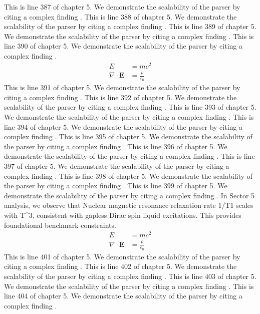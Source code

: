 This is line 387 of chapter 5. We demonstrate the scalability of the parser by citing a complex finding \cite{ref5_387}.
This is line 388 of chapter 5. We demonstrate the scalability of the parser by citing a complex finding \cite{ref5_388}.
This is line 389 of chapter 5. We demonstrate the scalability of the parser by citing a complex finding \cite{ref5_389}.
This is line 390 of chapter 5. We demonstrate the scalability of the parser by citing a complex finding \cite{ref5_390}.
\begin{align*}
  E &= mc^2 \\
  \nabla \cdot \mathbf{E} &= \frac{\rho}{\varepsilon_0}
\end{align*}
This is line 391 of chapter 5. We demonstrate the scalability of the parser by citing a complex finding \cite{ref5_391}.
This is line 392 of chapter 5. We demonstrate the scalability of the parser by citing a complex finding \cite{ref5_392}.
This is line 393 of chapter 5. We demonstrate the scalability of the parser by citing a complex finding \cite{ref5_393}.
This is line 394 of chapter 5. We demonstrate the scalability of the parser by citing a complex finding \cite{ref5_394}.
This is line 395 of chapter 5. We demonstrate the scalability of the parser by citing a complex finding \cite{ref5_395}.
This is line 396 of chapter 5. We demonstrate the scalability of the parser by citing a complex finding \cite{ref5_396}.
This is line 397 of chapter 5. We demonstrate the scalability of the parser by citing a complex finding \cite{ref5_397}.
This is line 398 of chapter 5. We demonstrate the scalability of the parser by citing a complex finding \cite{ref5_398}.
This is line 399 of chapter 5. We demonstrate the scalability of the parser by citing a complex finding \cite{ref5_399}.
In Sector 5 analysis, we observe that Nuclear magnetic resonance relaxation rate 1/T1 scales with T^3, consistent with gapless Dirac spin liquid excitations. This provides foundational benchmark constraints.
\begin{align*}
  E &= mc^2 \\
  \nabla \cdot \mathbf{E} &= \frac{\rho}{\varepsilon_0}
\end{align*}
This is line 401 of chapter 5. We demonstrate the scalability of the parser by citing a complex finding \cite{ref5_401}.
This is line 402 of chapter 5. We demonstrate the scalability of the parser by citing a complex finding \cite{ref5_402}.
This is line 403 of chapter 5. We demonstrate the scalability of the parser by citing a complex finding \cite{ref5_403}.
This is line 404 of chapter 5. We demonstrate the scalability of the parser by citing a complex finding \cite{ref5_404}.
